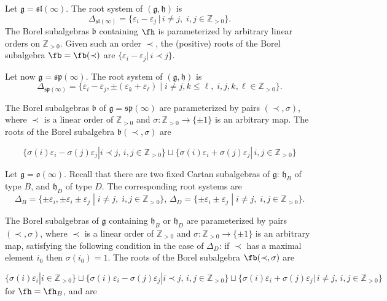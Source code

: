\documentclass[12pt]{amsart}
\def\gb{\mathfrak{b}}
\def\gg{\mathfrak{g}}
\def\gh{\mathfrak{h}}
\def\gh{\mathfrak h}
\begin{document}
Let $\gg = \mathfrak{sl} (\infty)$. The root system of $(\gg,\gh)$ is 
$$
\Delta_{\mathfrak{sl}(\infty)} = \{\varepsilon_i-\varepsilon_j \,|\, i\neq j,\; i,j\in \mathbb{Z}_{> 0}\}.
$$ 
The   Borel subalgebras $\gb$ containing $\fh$ is parameterized by arbitrary linear orders on $\mathbb Z_{> 0}$.  Given such an order $\prec$, the (positive) roots of the Borel subalgebra $\fb=\fb({\prec})$ are $\{\varepsilon_i-\varepsilon_j| \,i \prec j\}$.








Let now $\gg = \mathfrak{sp} (\infty)$. The root system of $(\gg, \gh)$ is
$$
\Delta_{\mathfrak{sp} (\infty)} = \{ \varepsilon_i - \varepsilon_j, \pm (\varepsilon_k + \varepsilon_{\ell}) \; | \; i \neq j, k \leq \ell, \; i,j,k, \ell\in \mathbb{Z}_{> 0} \}.
$$

The  Borel subalgebras $\gb$ of $\gg = \mathfrak{sp} (\infty)$ are parameterized by  pairs $(\prec, \sigma)$, where $\prec$ is a linear order of $\mathbb Z_{>0}$ and $\sigma : \mathbb Z_{>0} \to \{ \pm 1 \}$ is an arbitrary map. The  roots of the Borel subalgebra $\gb  (\prec, \sigma)$ are

$$\{\sigma(i)\varepsilon_i-\sigma(j)\varepsilon_j| i\prec j, \, i,j\in \mathbb{Z}_{> 0}\}\sqcup\{\sigma(i)\varepsilon_i+\sigma(j)\varepsilon_j| \, i,j\in \mathbb{Z}_{> 0}\}$$



Let $\gg = \mathfrak{o} (\infty)$.  Recall that there are two fixed  Cartan subalgebras of $\gg$: $\gh_B$ of type $B$, and $\gh_D$ of type $D$. The corresponding root systems are
$$\Delta_{B} = \{\pm \varepsilon_i, \pm \varepsilon_i \pm \varepsilon_j \; | \; i \neq j , \;  i,j\in \mathbb{Z}_{> 0}\}, \, \Delta_{D} = \{\pm \varepsilon_i \pm \varepsilon_j \; | \; i \neq j, \;  i,j\in \mathbb{Z}_{> 0} \}.$$


The  Borel subalgebras of $\gg$ containing $\gh_B$ or $\gh_D$ are parameterized by pairs $(\prec, \sigma)$, where $\prec$ is a linear order of $\mathbb Z_{>0}$ and $\sigma : \mathbb Z_{>0} \to \{ \pm1\}$ is an arbitrary map, satisfying the following condition in the case of $\Delta_D$:  if $\prec$ has a maximal element $i_0$ then $\sigma (i_0) = 1$. The roots of the Borel subalgebra $\fb(\prec,\sigma)$ are

$$\{\sigma(i)\varepsilon_i |  i\in \mathbb{Z}_{> 0}\}\sqcup\{\sigma(i)\varepsilon_i-\sigma(j)\varepsilon_j| i\prec j, \, i,j\in \mathbb{Z}_{> 0}\}\sqcup\{\sigma(i)\varepsilon_i+\sigma(j)\varepsilon_j| \, i\neq j,\, i,j\in \mathbb{Z}_{> 0}\}$$
for $\fh=\fh_B$, and are
\end{document}

